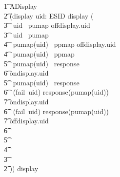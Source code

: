 \begin{circusaction}
        \t1 ADisplay \circdef \\
        \t2 (\lpar \lchanset display \rchanset \rpar uid: ESID \circspot \lpar \emptyset \rpar display \then ( \\
        \t3 \circif\ uid \notin \dom~pumap \circthen offdisplay.uid \then \Skip\\
        \t3 \circelse\ uid \in \dom~pumap \circthen \\  
            \t4 \circif\ pumap(uid) \notin \dom~ppmap \circthen offdisplay.uid \then \Skip\\
            \t4 \circelse\ pumap(uid) \in \dom~ppmap \circthen \\  
                \t5 \circif\ pumap(uid) \notin \dom~response \circthen \\
                    \t6 ondisplay.uid \then \Skip\\
                \t5 \circelse\ pumap(uid) \in \dom~response \circthen \\  
                    \t6 \circif\ (fail~uid) \notin response(pumap(uid)) \circthen \\
                    \t7 ondisplay.uid \then \Skip\\
                    \t6 \circelse\ (fail~uid) \in response(pumap(uid)) \circthen \\
                    \t7 offdisplay.uid \then \Skip \\  
                    \t6 \circfi \\
                \t5 \circfi \\
            \t4 \circfi \\
        \t3 \circfi \\
        \t2 )) \circhide \lchanset display \rchanset \\

\end{circusaction}
